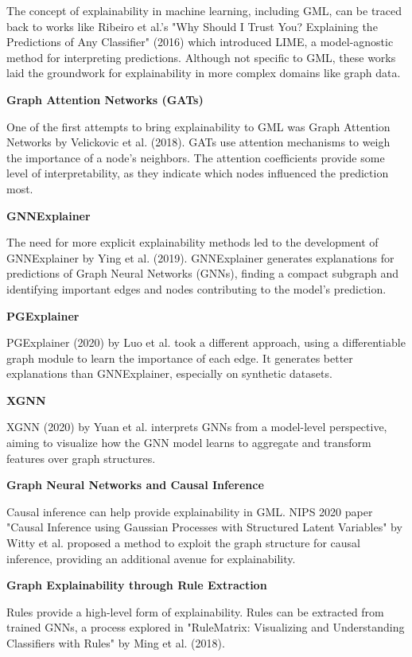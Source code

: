\documentclass[final]{article}
\begin{document}
The concept of explainability in machine learning, including GML, can be traced back to works like Ribeiro et al.'s "Why Should I Trust You? Explaining the Predictions of Any Classifier" (2016) which introduced LIME, a model-agnostic method for interpreting predictions. Although not specific to GML, these works laid the groundwork for explainability in more complex domains like graph data. \cite{inproceedings}

\textbf{Graph Attention Networks (GATs)}
  
One of the first attempts to bring explainability to GML was Graph Attention Networks by Velickovic et al. (2018). \cite{velivckovic2018} GATs use attention mechanisms to weigh the importance of a node's neighbors. The attention coefficients provide some level of interpretability, as they indicate which nodes influenced the prediction most.

\textbf{GNNExplainer}

   The need for more explicit explainability methods led to the development of GNNExplainer by Ying et al. (2019). GNNExplainer generates explanations for predictions of Graph Neural Networks (GNNs), finding a compact subgraph and identifying important edges and nodes contributing to the model's prediction. \cite{ying2019gnnexplainer}

\textbf{PGExplainer}

   PGExplainer (2020) by Luo et al. took a different approach, using a differentiable graph module to learn the importance of each edge. It generates better explanations than GNNExplainer, especially on synthetic datasets. \cite{luo2020parameterized}

\textbf{XGNN}

   XGNN (2020) by Yuan et al. interprets GNNs from a model-level perspective, aiming to visualize how the GNN model learns to aggregate and transform features over graph structures. \cite{Yuan_2020}

\textbf{Graph Neural Networks and Causal Inference}

   Causal inference can help provide explainability in GML. NIPS 2020 paper "Causal Inference using Gaussian Processes with Structured Latent Variables" by Witty et al. proposed a method to exploit the graph structure for causal inference, providing an additional avenue for explainability. \cite{witty2020causal}

\textbf{Graph Explainability through Rule Extraction}

   Rules provide a high-level form of explainability. Rules can be extracted from trained GNNs, a process explored in "RuleMatrix: Visualizing and Understanding Classifiers with Rules" by Ming et al. (2018). \cite{8440085}
   
\end{document}
